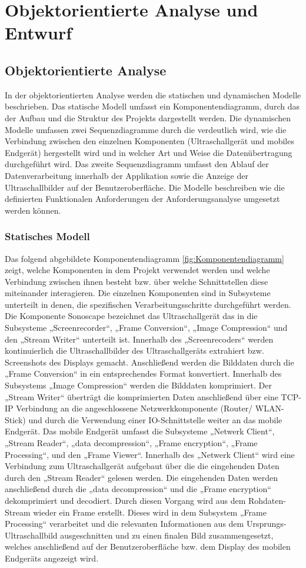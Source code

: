 \chapter{Objektorientierte Analyse und Entwurf}
\section{Objektorientierte Analyse}
In der objektorientierten Analyse werden die statischen und dynamischen Modelle beschrieben. Das statische Modell umfasst ein Komponentendiagramm, durch das der Aufbau und die Struktur des Projekts dargestellt werden. Die dynamischen Modelle umfassen zwei Sequenzdiagramme durch die verdeutlich wird, wie die Verbindung zwischen den einzelnen Komponenten (Ultraschallgerät und mobiles Endgerät) hergestellt wird und in welcher Art und Weise die Datenübertragung durchgeführt wird. Das zweite Sequenzdiagramm umfasst den Ablauf der Datenverarbeitung innerhalb der Applikation sowie die Anzeige der Ultraschallbilder auf der Benutzeroberfläche. Die Modelle beschreiben wie die definierten Funktionalen Anforderungen der Anforderungsanalyse umgesetzt werden können. 
\subsection{Statisches Modell}
Das folgend abgebildete Komponentendiagramm \ref{fig:Komponentendiagramm} zeigt, welche Komponenten in dem Projekt verwendet werden und welche Verbindung zwischen ihnen besteht bzw. über welche Schnittstellen diese miteinander interagieren. Die  einzelnen Komponenten sind in Subsysteme unterteilt in denen, die spezifischen Verarbeitungsschritte durchgeführt werden.  Die Komponente Sonoscape bezeichnet das Ultraschallgerät das in die Subsysteme „Screenrecorder“, „Frame Conversion“, „Image Compression“ und den „Stream Writer“ unterteilt ist. Innerhalb des „Screenrecoders“ werden kontinuierlich die Ultraschallbilder des Ultraschallgeräts extrahiert bzw. Screenshots des Displays gemacht. Anschließend werden die Bilddaten durch die „Frame Conversion“ in ein entsprechendes Format konvertiert. Innerhalb des Subsystems „Image Compression“ werden die Bilddaten komprimiert. Der „Stream Writer“ überträgt die komprimierten Daten anschließend über eine TCP-IP Verbindung an die angeschlossene Netzwerkkomponente (Router/ WLAN-Stick) und durch die Verwendung einer IO-Schnittstelle weiter an das mobile Endgerät. Das mobile Endgerät umfasst die Subsysteme „Netwerk Client“, „Stream Reader“, „data decompression“, „Frame encryption“, „Frame Processing“, und den „Frame Viewer“. Innerhalb des „Netwerk Client“ wird eine Verbindung zum Ultraschallgerät aufgebaut über die die eingehenden Daten durch den „Stream Reader“ gelesen werden. Die eingehenden Daten werden anschließend durch die „data decompression“ und die „Frame encryption“ dekomprimiert und  decodiert. Durch diesen Vorgang wird aus dem Rohdaten-Stream wieder ein Frame erstellt. Dieses wird in dem Subsystem „Frame Processing“ verarbeitet und die relevanten Informationen aus dem Ursprungs-Ultraschallbild ausgeschnitten und zu einen finalen Bild zusammengesetzt, welches anschließend auf der Benutzeroberfläche bzw. dem Display des  mobilen Endgeräts angezeigt wird. \\


